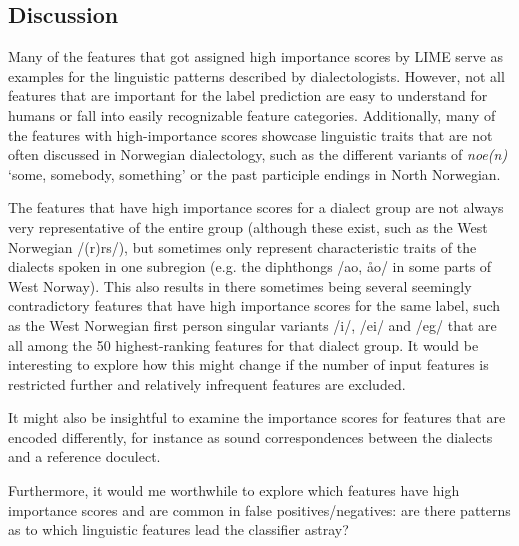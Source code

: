 \subsection{Discussion}
\label{sec:dialects-discussion}

Many of the features that got assigned high importance scores by LIME serve as examples for the linguistic patterns described by dialectologists.
However, not all features that are important for the label prediction are easy to understand for humans or fall into easily recognizable feature categories.
Additionally, many of the features with high-importance scores showcase linguistic traits that are not often discussed in Norwegian dialectology, such as the different variants of \textit{noe(n)} `some, somebody, something' or the past participle endings in North Norwegian.

The features that have high importance scores for a dialect group are not always very representative of the entire group (although these exist, such as the West Norwegian /(r)rs/), but sometimes only represent characteristic traits of the dialects spoken in one subregion (e.g. the diphthongs /ao, \aa{}o/ in some parts of West Norway).
This also results in there sometimes being several seemingly contradictory features that have high importance scores for the same label, such as the West Norwegian first person singular variants /i/, /ei/ and /eg/ that are all among the 50 highest-ranking features for that dialect group.
It would be interesting to explore how this might change if the number of input features is restricted further and relatively infrequent features are excluded.

It might also be insightful to examine the importance scores for features that are encoded differently, for instance as sound correspondences between the dialects and a reference doculect.

Furthermore, it would me worthwhile to explore which features have high importance scores and are common in false positives/negatives: are there patterns as to which linguistic features lead the classifier astray?
